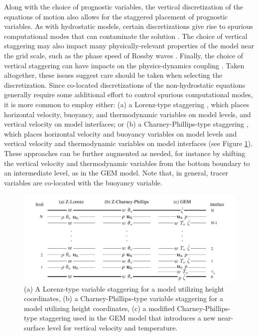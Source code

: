 \documentclass[gmd, manuscript]{copernicus}
\begin{document}
Along with the choice of prognostic variables, the vertical discretization of the equations of motion also allows for the staggered placement of prognostic variables.  As with hydrostatic models, certain discretizations give rise to spurious computational modes that can contaminate the solution \citep{tokioka1978some,arakawa1988baroclinic}.  The choice of vertical staggering may also impact many physically-relevant properties of the model near the grid scale, such as the phase speed of Rossby waves \citep{thuburn2005vertical}.  Finally, the choice of vertical staggering can have impacts on the physics-dynamics coupling \cite{holdaway2013comparison1,holdaway2013comparison2}.  Taken altogether, these issues suggest care should be taken when selecting the discretization.  Since co-located discretizations of the non-hydrostatic equations generally require some additional effort to control spurious computational modes, it is more common to employ either: (a) a Lorenz-type staggering \citep{lorenz1960energy}, which places horizontal velocity, buoyancy, and thermodynamic variables on model levels, and vertical velocity on model interfaces; or (b) a Charney-Phillips-type staggering \citep{charney1953numerical}, which places horizontal velocity and buoyancy variables on model levels and vertical velocity and thermodynamic variables on model interfaces (see Figure \ref{fig:verticalstaggering}).  These approaches can be further augmented as needed, for instance by shifting the vertical velocity and thermodynamic variables from the bottom boundary to an intermediate level, as in the GEM model.  Note that, in general, tracer variables are co-located with the buoyancy variable.

\begin{figure}[]
\includegraphics[width=5in]{VerticalStaggering_v2.pdf}
\caption{(a) A Lorenz-type variable staggering for a model utilizing height coordinates, (b) a Charney-Phillips-type variable staggering for a model utilizing height coordinates, (c) a modified Charney-Phillips-type staggering used in the GEM model that introduces a new near-surface level for vertical velocity and temperature.}
\label{fig:verticalstaggering}
\end{figure}
\end{document}
